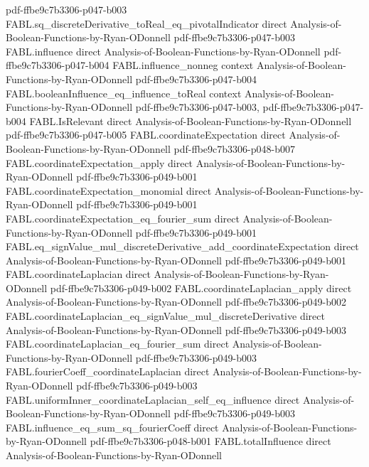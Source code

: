 \begin{theorem}
  {pdf-ffbe9c7b3306-p047-b003}
\proofstep
  {FABL.sq_discreteDerivative_toReal_eq_pivotalIndicator}
  {direct}
  {Analysis-of-Boolean-Functions-by-Ryan-ODonnell}
  {pdf-ffbe9c7b3306-p047-b003}
\proofstep
  {FABL.influence}
  {direct}
  {Analysis-of-Boolean-Functions-by-Ryan-ODonnell}
  {pdf-ffbe9c7b3306-p047-b004}
\proofstep
  {FABL.influence_nonneg}
  {context}
  {Analysis-of-Boolean-Functions-by-Ryan-ODonnell}
  {pdf-ffbe9c7b3306-p047-b004}
\proofstep
  {FABL.booleanInfluence_eq_influence_toReal}
  {context}
  {Analysis-of-Boolean-Functions-by-Ryan-ODonnell}
  {pdf-ffbe9c7b3306-p047-b003,
    pdf-ffbe9c7b3306-p047-b004}
\proofstep
  {FABL.IsRelevant}
  {direct}
  {Analysis-of-Boolean-Functions-by-Ryan-ODonnell}
  {pdf-ffbe9c7b3306-p047-b005}
\proofstep
  {FABL.coordinateExpectation}
  {direct}
  {Analysis-of-Boolean-Functions-by-Ryan-ODonnell}
  {pdf-ffbe9c7b3306-p048-b007}
\proofstep
  {FABL.coordinateExpectation_apply}
  {direct}
  {Analysis-of-Boolean-Functions-by-Ryan-ODonnell}
  {pdf-ffbe9c7b3306-p049-b001}
\proofstep
  {FABL.coordinateExpectation_monomial}
  {direct}
  {Analysis-of-Boolean-Functions-by-Ryan-ODonnell}
  {pdf-ffbe9c7b3306-p049-b001}
\proofstep
  {FABL.coordinateExpectation_eq_fourier_sum}
  {direct}
  {Analysis-of-Boolean-Functions-by-Ryan-ODonnell}
  {pdf-ffbe9c7b3306-p049-b001}
\proofstep
  {FABL.eq_signValue_mul_discreteDerivative_add_coordinateExpectation}
  {direct}
  {Analysis-of-Boolean-Functions-by-Ryan-ODonnell}
  {pdf-ffbe9c7b3306-p049-b001}
\proofstep
  {FABL.coordinateLaplacian}
  {direct}
  {Analysis-of-Boolean-Functions-by-Ryan-ODonnell}
  {pdf-ffbe9c7b3306-p049-b002}
\proofstep
  {FABL.coordinateLaplacian_apply}
  {direct}
  {Analysis-of-Boolean-Functions-by-Ryan-ODonnell}
  {pdf-ffbe9c7b3306-p049-b002}
\proofstep
  {FABL.coordinateLaplacian_eq_signValue_mul_discreteDerivative}
  {direct}
  {Analysis-of-Boolean-Functions-by-Ryan-ODonnell}
  {pdf-ffbe9c7b3306-p049-b003}
\proofstep
  {FABL.coordinateLaplacian_eq_fourier_sum}
  {direct}
  {Analysis-of-Boolean-Functions-by-Ryan-ODonnell}
  {pdf-ffbe9c7b3306-p049-b003}
\proofstep
  {FABL.fourierCoeff_coordinateLaplacian}
  {direct}
  {Analysis-of-Boolean-Functions-by-Ryan-ODonnell}
  {pdf-ffbe9c7b3306-p049-b003}
\proofstep
  {FABL.uniformInner_coordinateLaplacian_self_eq_influence}
  {direct}
  {Analysis-of-Boolean-Functions-by-Ryan-ODonnell}
  {pdf-ffbe9c7b3306-p049-b003}
\proofstep
  {FABL.influence_eq_sum_sq_fourierCoeff}
  {direct}
  {Analysis-of-Boolean-Functions-by-Ryan-ODonnell}
  {pdf-ffbe9c7b3306-p048-b001}
\proofstep
  {FABL.totalInfluence}
  {direct}
  {Analysis-of-Boolean-Functions-by-Ryan-ODonnell}

\end{theorem}
